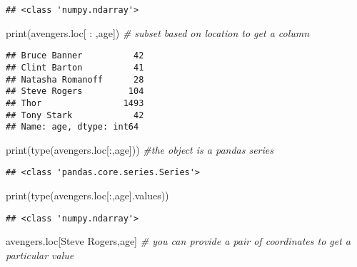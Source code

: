 \documentclass[
]{book}
\newenvironment{Shaded}{\begin{snugshade}}{\end{snugshade}}
\newcommand{\BuiltInTok}[1]{#1}
\newcommand{\CommentTok}[1]{\textcolor[rgb]{0.56,0.35,0.01}{\textit{#1}}}
\newcommand{\NormalTok}[1]{#1}
\newcommand{\StringTok}[1]{\textcolor[rgb]{0.31,0.60,0.02}{#1}}
\begin{document}
\begin{verbatim}
## <class 'numpy.ndarray'>
\end{verbatim}

\begin{Shaded}
\begin{Highlighting}[]
\BuiltInTok{print}\NormalTok{(avengers.loc[ : ,}\StringTok{\textquotesingle{}age\textquotesingle{}}\NormalTok{]) }\CommentTok{\# subset based on location to get a column}
\end{Highlighting}
\end{Shaded}

\begin{verbatim}
## Bruce Banner          42
## Clint Barton          41
## Natasha Romanoff      28
## Steve Rogers         104
## Thor                1493
## Tony Stark            42
## Name: age, dtype: int64
\end{verbatim}

\begin{Shaded}
\begin{Highlighting}[]
\BuiltInTok{print}\NormalTok{(}\BuiltInTok{type}\NormalTok{(avengers.loc[:,}\StringTok{\textquotesingle{}age\textquotesingle{}}\NormalTok{]))  }\CommentTok{\#the object is a pandas series}
\end{Highlighting}
\end{Shaded}

\begin{verbatim}
## <class 'pandas.core.series.Series'>
\end{verbatim}

\begin{Shaded}
\begin{Highlighting}[]
\BuiltInTok{print}\NormalTok{(}\BuiltInTok{type}\NormalTok{(avengers.loc[:,}\StringTok{\textquotesingle{}age\textquotesingle{}}\NormalTok{].values))}
\end{Highlighting}
\end{Shaded}

\begin{verbatim}
## <class 'numpy.ndarray'>
\end{verbatim}

\begin{Shaded}
\begin{Highlighting}[]
\NormalTok{avengers.loc[}\StringTok{\textquotesingle{}Steve Rogers\textquotesingle{}}\NormalTok{,}\StringTok{\textquotesingle{}age\textquotesingle{}}\NormalTok{]  }\CommentTok{\# you can provide a pair of \textquotesingle{}coordinates\textquotesingle{} to get a particular value}
\end{Highlighting}
\end{Shaded}
\end{document}

